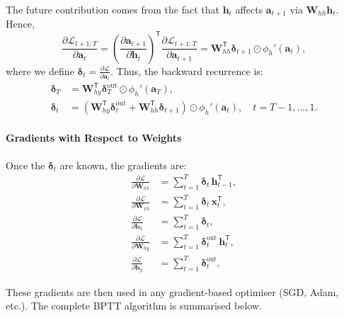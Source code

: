 \documentclass{tufte-handout}
\begin{document}
The future contribution comes from the fact that $\mathbf{h}_t$ affects $\mathbf{a}_{t+1}$ via $\mathbf{W}_{hh}\mathbf{h}_t$. Hence,
\[
\frac{\partial \mathcal{L}_{t+1:T}}{\partial \mathbf{a}_t}
= \left( \frac{\partial \mathbf{a}_{t+1}}{\partial \mathbf{h}_t} \right)^{\mathsf{T}} \frac{\partial \mathcal{L}_{t+1:T}}{\partial \mathbf{a}_{t+1}}
= \mathbf{W}_{hh}^{\mathsf{T}} \boldsymbol{\delta}_{t+1} \odot \phi_h'(\mathbf{a}_t),
\]
where we define $\boldsymbol{\delta}_t = \frac{\partial \mathcal{L}}{\partial \mathbf{a}_t}$. Thus, the backward recurrence is:
\begin{align}
    \boldsymbol{\delta}_T &= \mathbf{W}_{hy}^{\mathsf{T}} \boldsymbol{\delta}_T^{\text{out}} \odot \phi_h'(\mathbf{a}_T), \\
    \boldsymbol{\delta}_t &= \left( \mathbf{W}_{hy}^{\mathsf{T}} \boldsymbol{\delta}_t^{\text{out}} + \mathbf{W}_{hh}^{\mathsf{T}} \boldsymbol{\delta}_{t+1} \right) \odot \phi_h'(\mathbf{a}_t), \quad t = T-1, \dots, 1.
\end{align}

\paragraph{Gradients with Respect to Weights}
Once the $\boldsymbol{\delta}_t$ are known, the gradients are:
\begin{align}
    \frac{\partial \mathcal{L}}{\partial \mathbf{W}_{hh}} &= \sum_{t=1}^{T} \boldsymbol{\delta}_t \, \mathbf{h}_{t-1}^{\mathsf{T}}, \\
    \frac{\partial \mathcal{L}}{\partial \mathbf{W}_{xh}} &= \sum_{t=1}^{T} \boldsymbol{\delta}_t \, \mathbf{x}_t^{\mathsf{T}}, \\
    \frac{\partial \mathcal{L}}{\partial \mathbf{b}_h} &= \sum_{t=1}^{T} \boldsymbol{\delta}_t, \\
    \frac{\partial \mathcal{L}}{\partial \mathbf{W}_{hy}} &= \sum_{t=1}^{T} \boldsymbol{\delta}_t^{\text{out}} \, \mathbf{h}_t^{\mathsf{T}}, \\
    \frac{\partial \mathcal{L}}{\partial \mathbf{b}_y} &= \sum_{t=1}^{T} \boldsymbol{\delta}_t^{\text{out}}.
\end{align}

These gradients are then used in any gradient‑based optimiser (SGD, Adam, etc.). The complete BPTT algorithm is summarised below.
\end{document}
